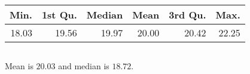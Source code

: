 \documentclass[twocolumn]{article}
\begin{document}
\subsection{}
\begin{table}[h]
\begin{tabular}{@{}llllll@{}}
\toprule
Min.                      & 1st Qu.                   & Median                    & Mean                      & 3rd Qu.                   & Max.                      \\ \midrule
\multicolumn{1}{r}{18.03} & \multicolumn{1}{r}{19.56} & \multicolumn{1}{r}{19.97} & \multicolumn{1}{r}{20.00} & \multicolumn{1}{r}{20.42} & \multicolumn{1}{r}{22.25} \\ \bottomrule
\end{tabular}
\end{table}

\subsection{}
Mean is $20.03$ and median is $18.72$.

\end{document}
